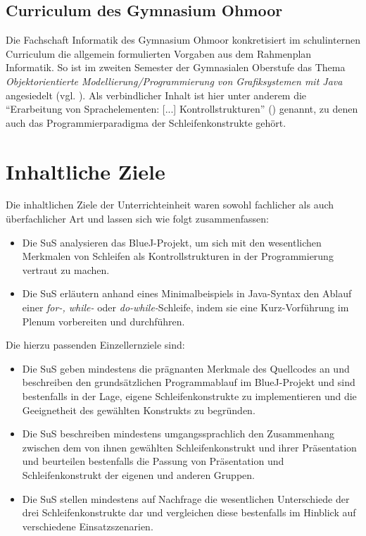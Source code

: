 \documentclass[paper=a4, DIV=13, BCOR=12mm, twoside=on, onecolumn=on, open = any, titlepage =on, parskip =half-, headsepline = on, footsepline = on, chapterprefix = on, sectionprefix = on, appendixprefix = off, fontsize = 11pt, numbers = noenddot, abstract = off]{scrreprt}
\begin{document}
\subsection{Curriculum des Gymnasium Ohmoor}
\onehalfspacing
Die Fachschaft Informatik des Gymnasium Ohmoor konkretisiert im schulinternen Curriculum die allgemein formulierten Vorgaben aus dem Rahmenplan Informatik. So ist im zweiten Semester der Gymnasialen Oberstufe das Thema \textit{Objektorientierte Modellierung/Programmierung von Grafiksystemen mit Java} angesiedelt (vgl. \cite[S.6f.]{ohmoor:16}). Als verbindlicher Inhalt ist hier unter anderem die "`Erarbeitung von Sprachelementen: [...] Kontrollstrukturen"' (\cite[S.7]{ohmoor:16}) genannt, zu denen auch das Programmierparadigma der Schleifenkonstrukte gehört.

\par \singlespacing
 \section{Inhaltliche Ziele}
\onehalfspacing
Die inhaltlichen Ziele der Unterrichteinheit waren sowohl fachlicher als auch überfachlicher Art und lassen sich wie folgt zusammenfassen:
\begin{itemize}
\item Die SuS analysieren das BlueJ-Projekt, um sich mit den wesentlichen Merkmalen von Schleifen als Kontrollstrukturen in der Programmierung vertraut zu machen.
\item Die SuS erläutern anhand eines Minimalbeispiels in Java-Syntax den Ablauf einer \emph{for-, while-} oder \emph{do-while-}Schleife, indem sie eine Kurz-Vorführung im Plenum vorbereiten und durchführen.
\end{itemize}
Die hierzu passenden Einzellernziele sind:
\begin{itemize}
\item Die SuS geben mindestens die prägnanten Merkmale des Quellcodes an und beschreiben den grundsätzlichen Programmablauf im BlueJ-Projekt und sind bestenfalls in der Lage, eigene Schleifenkonstrukte zu implementieren und die Geeignetheit des gewählten Konstrukts zu begründen.
\item Die SuS beschreiben mindestens umgangssprachlich den Zusammenhang zwischen dem von ihnen gewählten Schleifenkonstrukt und ihrer Präsentation und beurteilen bestenfalls die Passung von Präsentation und Schleifenkonstrukt der eigenen und anderen Gruppen.
\item Die SuS stellen mindestens auf Nachfrage die wesentlichen Unterschiede der drei Schleifenkonstrukte dar und vergleichen diese bestenfalls im Hinblick auf verschiedene Einsatzszenarien.
\end{itemize}
\end{document}
